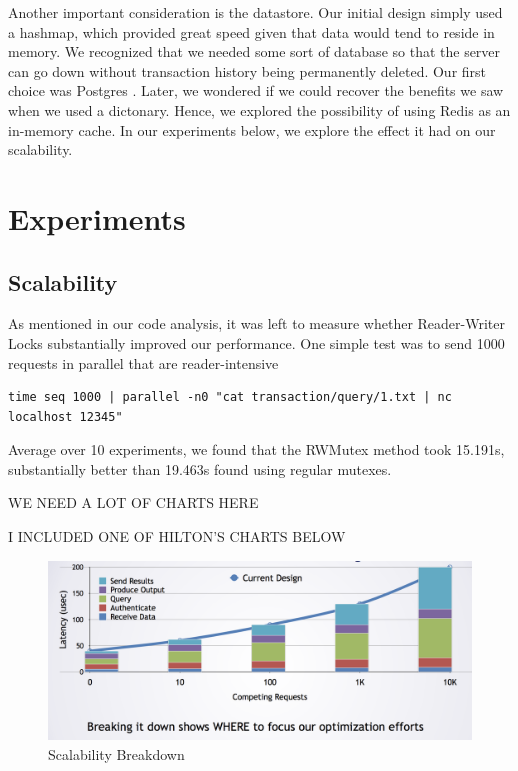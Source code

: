 \documentclass[titlepage, 11pt]{article}
\newcommand\0{\mathbf{0}}
\newcommand\<{\langle}
\renewcommand\>{\rangle}
\begin{document}
Another important consideration is the datastore. Our initial design simply used a hashmap, which provided great speed given that data would tend to reside in memory. We recognized that we needed some sort of database so that the server can go down without transaction history being permanently deleted. Our first choice was Postgres . Later, we wondered if we could recover the benefits we saw when we used a dictonary. Hence, we explored the possibility of using Redis as an in-memory cache. In our experiments below, we explore the effect it had on our scalability.

\section{Experiments}


\subsection{Scalability}

As mentioned in our code analysis, it was left to measure whether Reader-Writer Locks substantially improved our performance. One simple test was to send 1000 requests in parallel that are reader-intensive 

\begin{lstlisting}
time seq 1000 | parallel -n0 "cat transaction/query/1.txt | nc localhost 12345"
\end{lstlisting}

Average over 10 experiments, we found that the RWMutex method took 15.191s, substantially better than 19.463s found using regular mutexes.

WE NEED A LOT OF CHARTS HERE

I INCLUDED ONE OF HILTON'S CHARTS BELOW

\begin{figure}[H]
\centering
\includegraphics[width=\linewidth]{sample_hilton.png}	
\caption{Scalability Breakdown}
\end{figure}
\end{document}
